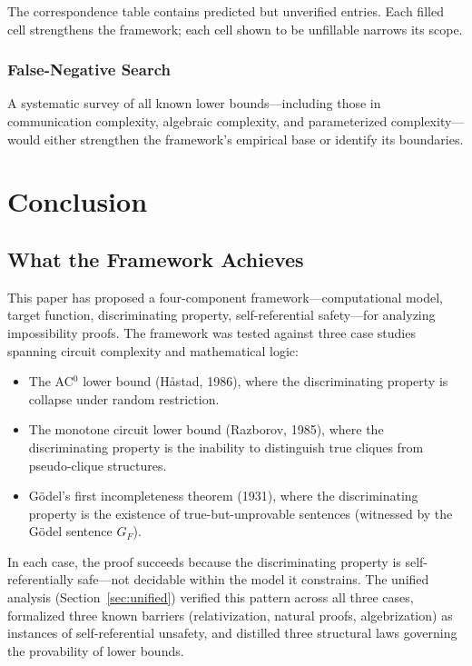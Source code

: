 \documentclass[11pt,a4paper]{article}
\theoremstyle{plain}
\theoremstyle{definition}
\theoremstyle{remark}
\begin{document}
The correspondence table contains predicted but unverified entries. Each filled cell strengthens the framework; each cell shown to be unfillable narrows its scope.

\subsubsection{False-Negative Search}

A systematic survey of all known lower bounds---including those in communication complexity, algebraic complexity, and parameterized complexity---would either strengthen the framework's empirical base or identify its boundaries.

\section{Conclusion}
\label{sec:conclusion}

\subsection{What the Framework Achieves}

This paper has proposed a four-component framework---computational model, target function, discriminating property, self-referential safety---for analyzing impossibility proofs. The framework was tested against three case studies spanning circuit complexity and mathematical logic:

\begin{itemize}
\item The AC$^0$ lower bound (H\r{a}stad, 1986), where the discriminating property is collapse under random restriction.
\item The monotone circuit lower bound (Razborov, 1985), where the discriminating property is the inability to distinguish true cliques from pseudo-clique structures.
\item G\"{o}del's first incompleteness theorem (1931), where the discriminating property is the existence of true-but-unprovable sentences (witnessed by the G\"{o}del sentence $G_F$).
\end{itemize}

In each case, the proof succeeds because the discriminating property is self-referentially safe---not decidable within the model it constrains. The unified analysis (Section~\ref{sec:unified}) verified this pattern across all three cases, formalized three known barriers (relativization, natural proofs, algebrization) as instances of self-referential unsafety, and distilled three structural laws governing the provability of lower bounds.
\end{document}
